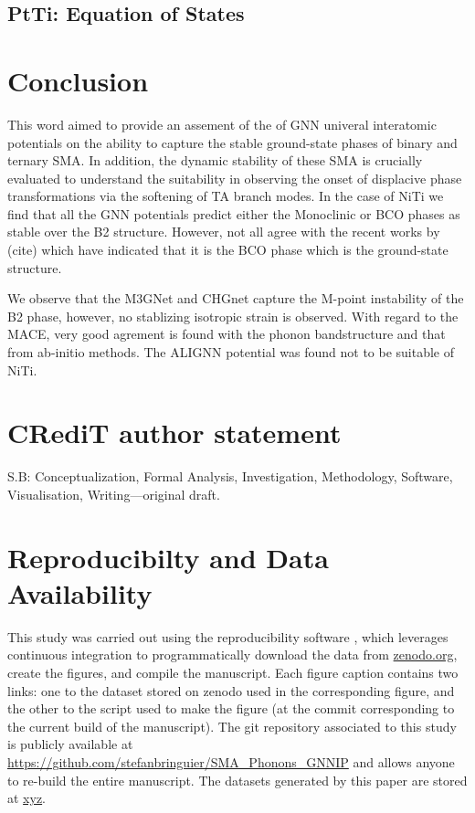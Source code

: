 \documentclass[preprint]{elsarticle}
\begin{document}



\subsection{PtTi: Equation of States}

\section{Conclusion}
\label{sec:conclusion}
This word aimed to provide an assement of the of GNN univeral interatomic potentials on the ability to capture the stable ground-state phases of binary and ternary SMA. In addition, the dynamic stability of these SMA is crucially evaluated to understand the suitability in observing the onset of displacive phase transformations via the softening of TA branch modes. In the case of NiTi we find that all the GNN potentials predict either the Monoclinic or BCO phases as stable over the B2 structure. However, not all agree with the recent works by (cite) which have indicated that it is the BCO phase which is the ground-state structure.

We observe that the M3GNet and CHGnet capture the M-point instability of the B2 phase, however, no stablizing isotropic strain is observed. With regard to the MACE, very good agrement is found with the phonon bandstructure and that from ab-initio methods. The ALIGNN potential was found not to be suitable of NiTi.






\section*{CR\lowercase{e}d\lowercase{i}T author statement}

S.B: Conceptualization, Formal Analysis, Investigation, Methodology, Software, Visualisation, Writing---original draft.


\section*{Reproducibilty and Data Availability}
This study was carried out using the reproducibility software \href{https://github.com/showyourwork/showyourwork}{\showyourwork}, which leverages continuous integration to programmatically download the data from \href{https://zenodo.org/}{zenodo.org}, create the figures, and compile the manuscript. Each figure caption contains two links: one to the dataset stored on zenodo used in the corresponding figure, and the other to the script used to make the figure (at the commit corresponding to the current build of the manuscript). The git repository associated to this study is publicly available at \url{https://github.com/stefanbringuier/SMA_Phonons_GNNIP} and allows anyone to re-build the entire manuscript. The datasets generated by this paper are stored at \url{xyz}.
\end{document}
